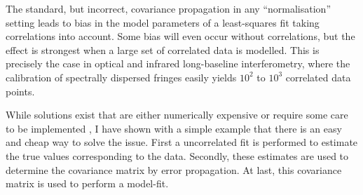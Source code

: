 \documentclass[a4paper,fleqn,usenatbib]{mnras}
\begin{document}
The standard, but incorrect, covariance propagation in any ``normalisation'' setting leads to bias in the model parameters of a least-squares fit taking correlations into account.  Some bias will even occur without correlations, but the effect is strongest when a large set of correlated data is modelled.  This is precisely the case in optical and infrared long-baseline interferometry, where the calibration of spectrally dispersed fringes easily yields $10^2$ to $10^3$ correlated data points.

While solutions exist that are either numerically expensive or require some care to be implemented \citep{BUR11,BEC12,NIS14}, I have shown with a simple example that there is an easy and cheap way to solve the issue. First a uncorrelated fit is performed to estimate the true values corresponding to the data.  Secondly, these estimates are used to determine the covariance matrix by error propagation. At last, this covariance matrix is used to perform a model-fit.





\end{document}
